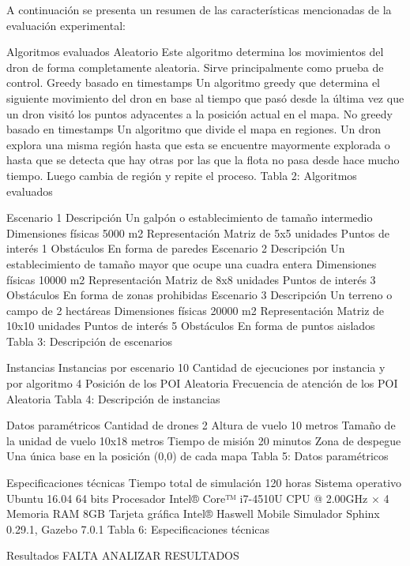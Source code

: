 A continuación se presenta un resumen de las características mencionadas de la evaluación experimental:


Algoritmos evaluados
Aleatorio
Este algoritmo determina los movimientos del dron de forma completamente aleatoria. Sirve principalmente como prueba de control.
Greedy basado en timestamps
Un algoritmo greedy que determina el siguiente movimiento del dron en base al tiempo que pasó desde la última vez que un dron visitó los puntos adyacentes a la posición actual en el mapa.
No greedy basado en timestamps
Un algoritmo que divide el mapa en regiones. Un dron explora una misma región hasta que esta se encuentre mayormente explorada o hasta que se detecta que hay otras por las que la flota no pasa desde hace mucho tiempo. Luego cambia de región y repite el proceso.
Tabla 2: Algoritmos evaluados























Escenario 1
Descripción
Un galpón o establecimiento de tamaño intermedio
Dimensiones físicas
5000 m2
Representación
Matriz de 5x5 unidades
Puntos de interés
1
Obstáculos
En forma de paredes
Escenario 2
Descripción
Un establecimiento de tamaño mayor que ocupe una cuadra entera
Dimensiones físicas
10000  m2
Representación
Matriz de 8x8 unidades
Puntos de interés
3
Obstáculos
En forma de zonas prohibidas
Escenario 3
Descripción
Un terreno o campo de 2 hectáreas
Dimensiones físicas
20000  m2
Representación
Matriz de 10x10 unidades
Puntos de interés
5
Obstáculos
En forma de puntos aislados
Tabla 3: Descripción de escenarios


Instancias
Instancias por escenario
10
Cantidad de ejecuciones por instancia y por algoritmo
4
Posición de los POI
Aleatoria
Frecuencia de atención de los POI
Aleatoria
Tabla 4: Descripción de instancias


Datos paramétricos
Cantidad de drones
2
Altura de vuelo
10 metros
Tamaño de la unidad de vuelo
10x18 metros
Tiempo de misión
20 minutos
Zona de despegue
Una única base en la posición (0,0) de cada mapa
Tabla 5: Datos paramétricos

Especificaciones técnicas
Tiempo total de simulación
120 horas
Sistema operativo
Ubuntu 16.04 64 bits
Procesador
Intel® Core™ i7-4510U CPU @ 2.00GHz × 4
Memoria RAM
8GB
Tarjeta gráfica
Intel® Haswell Mobile
Simulador
Sphinx 0.29.1, Gazebo 7.0.1
Tabla 6: Especificaciones técnicas

Resultados
FALTA ANALIZAR RESULTADOS

